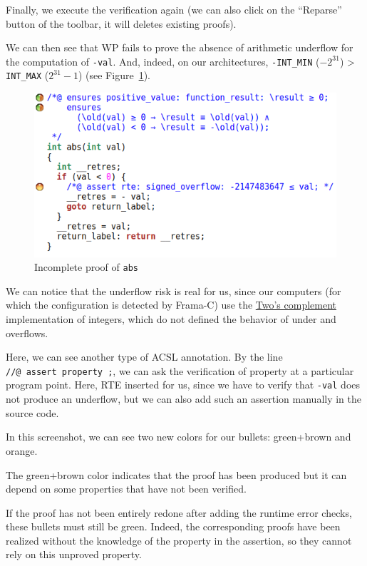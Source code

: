 \documentclass[12pt,francais,]{scrbook}
\newenvironment{zdsblock}[1]{%
  \tcolorbox[beamer,%
    noparskip,breakable,
    colback=LightBlue,colframe=DarkBlue,%
    colbacklower=DarkBlue,%
    title=#1]
}{\endtcolorbox}
\begin{document}
Finally, we execute the verification again (we can also click on the
``Reparse'' button of the toolbar, it will deletes existing proofs).

We can then see that WP fails to prove the absence of arithmetic
underflow for the computation of \texttt{-val}. And, indeed, on our
architectures, \texttt{-INT\_MIN} (\(-2^{31}\)) \textgreater{}
\texttt{INT\_MAX} (\(2^{31}-1\)) (see Figure~\ref{fig:2-1-1-abs-4}).

\begin{figure}[htbp]
\centering
\includegraphics[scale=0.5]{2-1-1-abs-4.png}
\caption{Incomplete proof of \texttt{abs}}
\label{fig:2-1-1-abs-4}
\end{figure}

\begin{zdsblock}{Information}
We can notice that the underflow risk
is real for us, since our computers (for which the
configuration is detected by Frama-C) use the 
\href{https://en.wikipedia.org/wiki/Two\%27s_complement}{Two's
complement} implementation of integers, which do not defined
the behavior of under and overflows.
\end{zdsblock}

Here, we can see another type of ACSL annotation. By the line
\texttt{//@\ assert\ property\ ;}, we can ask the verification of
property at a particular program point. Here, RTE inserted for us, since
we have to verify that \texttt{-val} does not produce an underflow, but
we can also add such an assertion manually in the source code.

In this screenshot, we can see two new colors for our bullets:
green+brown and orange.

The green+brown color indicates that the proof has been produced but it
can depend on some properties that have not been verified.

If the proof has not been entirely redone after adding the runtime error
checks, these bullets must still be green. Indeed, the corresponding
proofs have been realized without the knowledge of the property in the
assertion, so they cannot rely on this unproved property.
\end{document}
